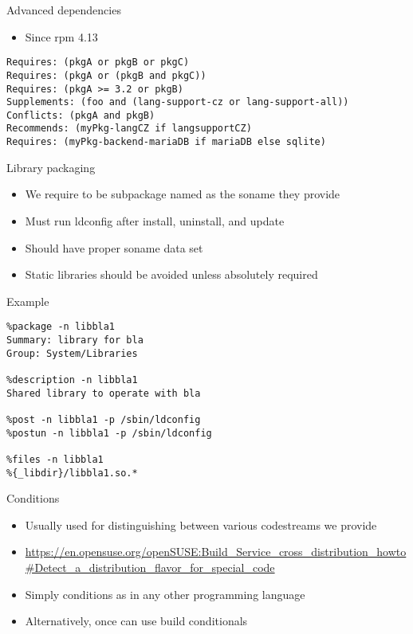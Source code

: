 \documentclass{beamer}
\begin{document}
\begin{frame}[fragile]{Advanced dependencies}
  \begin{itemize}
    \item Since rpm 4.13
  \end{itemize}
  \begin{small}
  \begin{verbatim}
Requires: (pkgA or pkgB or pkgC)
Requires: (pkgA or (pkgB and pkgC))
Requires: (pkgA >= 3.2 or pkgB)
Supplements: (foo and (lang-support-cz or lang-support-all))
Conflicts: (pkgA and pkgB)
Recommends: (myPkg-langCZ if langsupportCZ)
Requires: (myPkg-backend-mariaDB if mariaDB else sqlite)
	\end{verbatim}
	\end{small}
\end{frame}

\begin{frame}[t]{Library packaging}
	\begin{itemize}
	\item We require to be subpackage named as the soname they provide
    \item Must run ldconfig after install, uninstall, and update
    \item Should have proper soname data set
    \item Static libraries should be avoided unless absolutely required
	\end{itemize}
\end{frame}

\begin{frame}[fragile]{Example}
	\begin{small}
	\begin{verbatim}
%package -n libbla1
Summary: library for bla
Group: System/Libraries

%description -n libbla1
Shared library to operate with bla

%post -n libbla1 -p /sbin/ldconfig
%postun -n libbla1 -p /sbin/ldconfig

%files -n libbla1
%{_libdir}/libbla1.so.*
	\end{verbatim}
	\end{small}
\end{frame}

\begin{frame}[t]{Conditions}
	\begin{itemize}
	\item Usually used for distinguishing between various codestreams we provide
	\item \begin{tiny}\url{https://en.opensuse.org/openSUSE:Build\_Service\_cross\_distribution\_howto\#Detect\_a\_distribution\_flavor\_for\_special_code}\end{tiny}
	\item Simply conditions as in any other programming language
	\item Alternatively, once can use build conditionals
	\end{itemize}
\end{frame}
\end{document}

